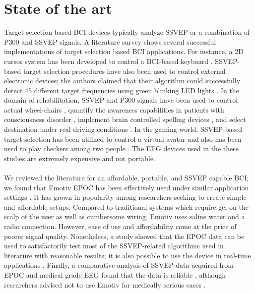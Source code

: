 \documentclass[smallextended]{svjour3}
\begin{document}
\section{State of the art}
\label{sec:soa}
Target selection based BCI devices typically analyze SSVEP or a combination of P300 and SSVEP signals. A literature survey shows several successful implementations of target selection based BCI applications. For instance, a 2D cursor system has been developed to control a BCI-based keyboard \cite{yin2015hybrid}. SSVEP-based target selection procedures have also been used to control external electronic devices; the authors claimed that their algorithm could successfully detect 45 different target frequencies using green blinking LED lights \cite{SSVEPfiability}. In the domain of rehabilitation, SSVEP and P300 signals have been used to control actual wheel-chairs \cite{paper4}, quantify the awareness capabilities in patients with consciousness disorder \cite{paper8}, implement brain controlled spelling devices \cite{paper2}, and select destination under real driving conditions \cite{car}. In the gaming world, SSVEP-based target selection has been utilized to control a virtual avatar \cite{paper_5} and also has been used to play checkers among two people \cite{paper6}. The EEG devices used in the these studies are extremely expensive and not portable.\\
\\
We reviewed the literature for an affordable, portable, and SSVEP capable BCI; we found that Emotiv EPOC has been effectively used under similar application settings \cite{jian2014improving,van2012designing}. It has grown in popularity among researchers seeking to create simple and affordable setups. Compared to traditional systems which require gel on the scalp of the user as well as cumbersome wiring, Emotiv uses saline water and a radio connection. However, ease of use and affordability come at the price of poorer signal quality.
Nonetheless, a study showed that the EPOC data can be used to satisfactorily test most of the SSVEP-related algorithms used in literature with reasonable results; it is also possible to use the device in real-time applications \cite{hvaring2014comparison}.
Finally, a comparative analysis of SSVEP data acquired from EPOC and medical grade EEG found that the data is reliable \cite{liu2012implementation}, although researchers advised not to use Emotiv for medically serious cases \cite{duvinage2013performance}.\\
\\
\end{document}
